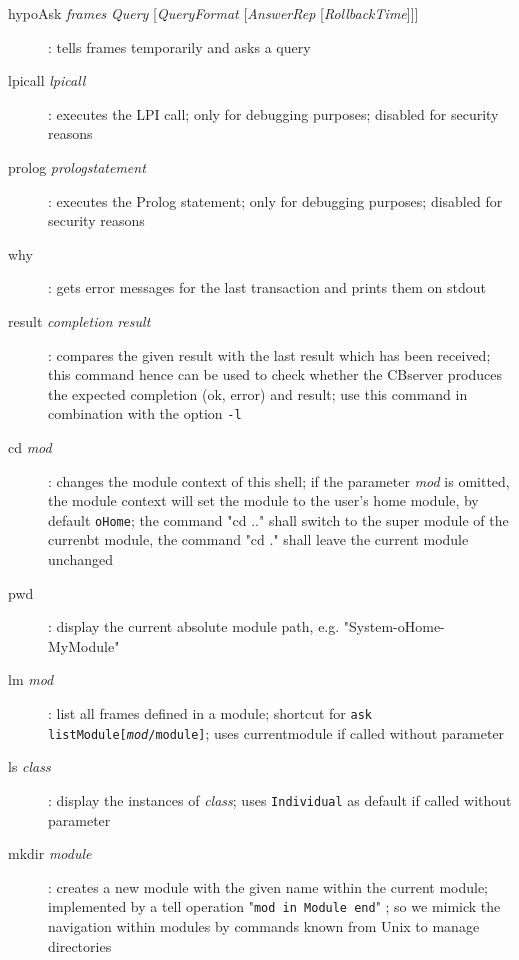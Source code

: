 \begin{description}
\item[hypoAsk {\it frames} {\it Query}  {[{\it QueryFormat} [{\it AnswerRep} [{\it RollbackTime}]]]}] :
      tells frames temporarily and asks a query

\item[lpicall {\it lpicall}] :
      executes the LPI call; only for debugging purposes; disabled for security reasons

\item[prolog {\it prologstatement}] :
      executes the Prolog statement; only for debugging purposes; disabled for security reasons

\item[why] :
      gets error messages for the last transaction and prints them on stdout
      
\item[result {\it completion} {\it result}] :
      compares the given result with the last result which has been received;
      this command hence can be used to check whether the CBserver produces
      the expected completion (ok, error) and result; use this command
      in combination with the option {\tt -l}

\item[cd {\it mod}] :
      changes the module context of this shell; if the parameter {\it mod} is omitted, 
      the module context will set the module to the user's home module, by default {\tt oHome};
      the command "cd .." shall switch to the super module of the currenbt module, the command
      "cd ." shall leave the current module unchanged

\item[pwd] :
      display the current absolute module path, e.g. "System-oHome-MyModule"

\item[lm {\it mod}] :
      list all frames defined in a module;
      shortcut for {\tt ask listModule[{\it mod}/module]};
      uses currentmodule if called without parameter

\item[ls {\it class}] :
      display the instances of {\it class};
      uses {\tt Individual} as default if called without parameter

\item[mkdir {\it module}] :
      creates a new module with the given name within the current module; implemented by
      a tell operation "{\tt mod in Module end}" ; so we mimick the navigation within modules by commands known from Unix
      to manage directories


\end{description}
